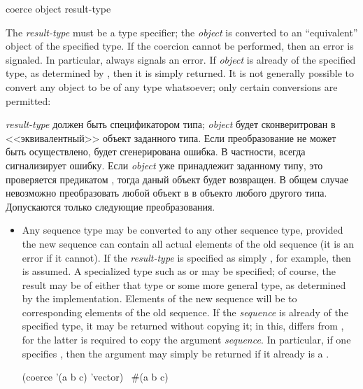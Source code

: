 \begin{defun}[Function]
coerce object result-type

The \textit{result-type} must be a type specifier; the \textit{object} is converted
to an ``equivalent'' object of the specified type.
If the coercion cannot be performed, then an error is signaled.
In particular,  always signals an error.
If \textit{object} is already of the specified type, as determined
by , then it is simply returned.
It is not generally
possible to convert any object to be of any type whatsoever; only certain
conversions are permitted:

\textit{result-type} должен быть спецификатором типа; \textit{object} будет
сконверитрован в <<эквивалентный>> объект заданного типа.
Если преобразование не может быть осуществлено, будет сгенерирована ошибка.
В частности,  всегда сигнализирует ошибку.
Если \textit{object} уже принадлежит заданному типу, это проверяется предикатом
, тогда даный объект будет возвращен.
В общем случае невозможно преобразовать любой объект в в объекто любого другого
типа. Допускаются только следующие преобразования.
\begin{itemize}
\item
Any sequence type may be converted to any other sequence type, provided
the new sequence can contain all actual elements of the old sequence
(it is an error if it cannot).  If the \textit{result-type} is specified as
simply , for example, then  is assumed.  A
specialized type such as  or 
may be specified; of course, the result may be of either that type or
some more general type, as determined by the implementation.
Elements of the new sequence will be  to corresponding elements
of the old sequence.
If the
\textit{sequence} is already of the specified type, it may be returned without
copying it; in this,  differs from
, for the latter is required to
copy the argument \textit{sequence}.  In particular, if one specifies
, then the argument may simply be returned if it already is
a .
\begin{lisp}
(coerce '(a b c) 'vector) \EV\ \#(a b c)
\end{lisp}


\end{itemize}
\end{defun}
